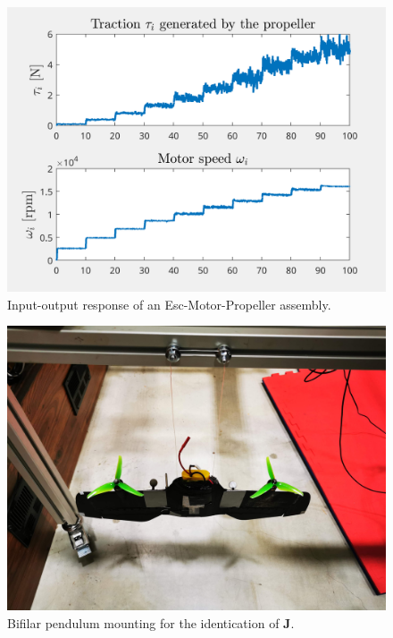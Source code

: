 \begin{figure}[ht!]
    \centerline{
    \includegraphics[trim=0cm 0cm 0cm 0cm,clip,width=1\columnwidth]{figures/ident_motor March 27 2024 1651.png}}
    \caption{Input-output response of an Esc-Motor-Propeller assembly.}
    \label{IOmot}
\end{figure}

\begin{figure}[ht!]
    \centerline{
    \includegraphics[trim=20cm 15cm 23cm 0cm,clip,width=0.6\columnwidth]{figures/IMG_20230609_085023.jpg}}
    \caption{Bifilar pendulum mounting for the identication of $\boldsymbol{J}$.}
    \label{fig:BifilarPend}
\end{figure}